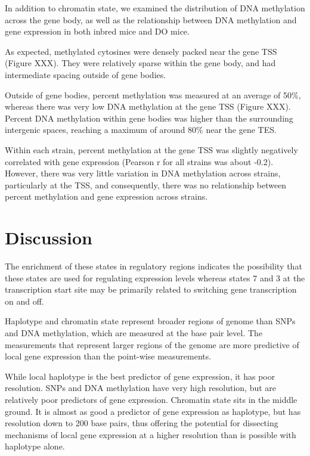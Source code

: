 \documentclass[10pt,letterpaper]{article}
\begin{document}
In addition to chromatin state, we examined the distribution of DNA
methylation across the gene body, as well as the relationship between
DNA methylation and gene expression in both inbred mice and DO mice.

As expected, methylated cytosines were densely packed near the gene TSS
(Figure XXX). They were relatively sparse within the gene body, and had
intermediate spacing outside of gene bodies.

Outside of gene bodies, percent methylation was measured at an average
of 50\%, whereas there was very low DNA methylation at the gene TSS
(Figure XXX). Percent DNA methylation within gene bodies was higher than
the surrounding intergenic spaces, reaching a maximum of around 80\%
near the gene TES.

Within each strain, percent methylation at the gene TSS was slightly
negatively correlated with gene expression (Pearson r for all strains
was about -0.2). However, there was very little variation in DNA
methylation across strains, particularly at the TSS, and consequently,
there was no relationship between percent methylation and gene
expression across strains.

\hypertarget{discussion}{%
\section{Discussion}\label{discussion}}

The enrichment of these states in regulatory regions indicates the
possibility that these states are used for regulating expression levels
whereas states 7 and 3 at the transcription start site may be primarily
related to switching gene transcription on and off.

Haplotype and chromatin state represent broader regions of genome than
SNPs and DNA methylation, which are measured at the base pair level. The
measurements that represent larger regions of the genome are more
predictive of local gene expression than the point-wise measurements.

While local haplotype is the best predictor of gene expression, it has
poor resolution. SNPs and DNA methylation have very high resolution, but
are relatively poor predictors of gene expression. Chromatin state sits
in the middle ground. It is almost as good a predictor of gene
expression as haplotype, but has resolution down to 200 base pairs, thus
offering the potential for dissecting mechanisms of local gene
expression at a higher resolution than is possible with haplotype alone.
\end{document}
